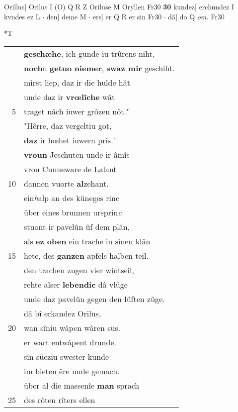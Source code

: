 \documentclass[8pt,a4paper,notitlepage]{article}
\begin{document}
\begin{table}[ht]
\begin{minipage}[t]{0.5\linewidth}
Orillus] Orilus I (O) Q R Z Oriluse M Oryllen Fr30 \textbf{30} kundez] erchundez I kvndes ez L  $\cdot$ den] deme M  $\cdot$ ers] er Q R er sin Fr30  $\cdot$ dâ] do Q \textit{om.} Fr30 \newline
\end{minipage}
\hspace{0.5cm}
\begin{minipage}[t]{0.5\linewidth}
\small
\begin{center}*T
\end{center}
\begin{tabular}{rl}
 & \textbf{geschæhe}, ich gunde iu trûrens niht,\\ 
 & \textbf{noch}n \textbf{getuo} \textbf{niemer}, \textbf{swaz mir} geschiht.\\ 
 & mirst liep, daz ir die hulde hât\\ 
 & unde daz ir \textbf{vrœlîche} wât\\ 
5 & traget nâch iuwer grôzen nôt."\\ 
 & "Hêrre, daz vergeltiu got,\\ 
 & \textbf{daz} ir hœhet iuwern prîs."\\ 
 & \textbf{vroun} Jeschuten unde ir âmîs\\ 
 & vrou Cunneware de Lalant\\ 
10 & dannen vuorte \textbf{al}zehant.\\ 
 & ein\textit{h}alp an des küneges rinc\\ 
 & über eines brunnen ursprin\textit{c}\\ 
 & stuont ir pavelûn ûf dem plân,\\ 
 & als \textbf{ez oben} ein trache in sînen klân\\ 
15 & hete, des \textbf{ganzen} apfels halben teil.\\ 
 & den trachen zugen vier wintseil,\\ 
 & rehte alser \textbf{lebendic} dâ vlüge\\ 
 & unde daz pavelûn gegen den lüften züge.\\ 
 & dâ bî erkandez Orilus,\\ 
20 & wan sîniu wâpen wâren sus.\\ 
 & er wart entwâpent drunde.\\ 
 & sîn süeziu swester kunde\\ 
 & im bieten êre unde gemach.\\ 
 & über al die massenîe \textbf{man} sprach\\ 
25 & des rôten rîters ellen\\ 

\end{tabular}
\end{minipage}
\end{table}
\end{document}
